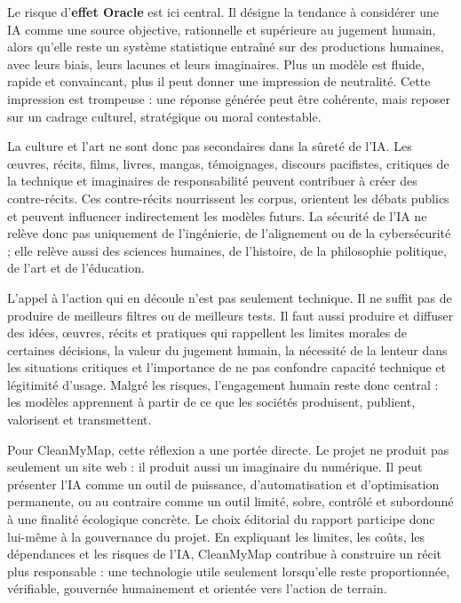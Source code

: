\documentclass[
  10pt,
  a4paper,
  DIV=11,
  numbers=noendperiod,
  oneside]{scrreprt}
\let\oldtextbf\textbf
\renewcommand{\textbf}[1]{\oldtextbf{\textcolor{cmmnavy}{#1}}}
\begin{document}
Le risque d'\textbf{effet Oracle} est ici central. Il désigne la
tendance à considérer une IA comme une source objective, rationnelle et
supérieure au jugement humain, alors qu'elle reste un système
statistique entraîné sur des productions humaines, avec leurs biais,
leurs lacunes et leurs imaginaires. Plus un modèle est fluide, rapide et
convaincant, plus il peut donner une impression de neutralité. Cette
impression est trompeuse : une réponse générée peut être cohérente, mais
reposer sur un cadrage culturel, stratégique ou moral contestable.

La culture et l'art ne sont donc pas secondaires dans la sûreté de l'IA.
Les œuvres, récits, films, livres, mangas, témoignages, discours
pacifistes, critiques de la technique et imaginaires de responsabilité
peuvent contribuer à créer des contre-récits. Ces contre-récits
nourrissent les corpus, orientent les débats publics et peuvent
influencer indirectement les modèles futurs. La sécurité de l'IA ne
relève donc pas uniquement de l'ingénierie, de l'alignement ou de la
cybersécurité ; elle relève aussi des sciences humaines, de l'histoire,
de la philosophie politique, de l'art et de l'éducation.

L'appel à l'action qui en découle n'est pas seulement technique. Il ne
suffit pas de produire de meilleurs filtres ou de meilleurs tests. Il
faut aussi produire et diffuser des idées, œuvres, récits et pratiques
qui rappellent les limites morales de certaines décisions, la valeur du
jugement humain, la nécessité de la lenteur dans les situations
critiques et l'importance de ne pas confondre capacité technique et
légitimité d'usage. Malgré les risques, l'engagement humain reste donc
central : les modèles apprennent à partir de ce que les sociétés
produisent, publient, valorisent et transmettent.

Pour CleanMyMap, cette réflexion a une portée directe. Le projet ne
produit pas seulement un site web : il produit aussi un imaginaire du
numérique. Il peut présenter l'IA comme un outil de puissance,
d'automatisation et d'optimisation permanente, ou au contraire comme un
outil limité, sobre, contrôlé et subordonné à une finalité écologique
concrète. Le choix éditorial du rapport participe donc lui-même à la
gouvernance du projet. En expliquant les limites, les coûts, les
dépendances et les risques de l'IA, CleanMyMap contribue à construire un
récit plus responsable : une technologie utile seulement lorsqu'elle
reste proportionnée, vérifiable, gouvernée humainement et orientée vers
l'action de terrain.
\end{document}
